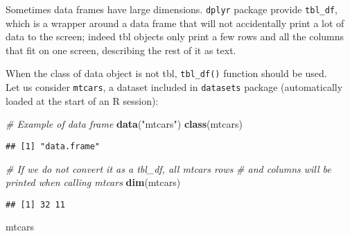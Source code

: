 \documentclass[]{book}
\newenvironment{Shaded}{\begin{snugshade}}{\end{snugshade}}
\newcommand{\KeywordTok}[1]{\textcolor[rgb]{0.13,0.29,0.53}{\textbf{{#1}}}}
\newcommand{\StringTok}[1]{\textcolor[rgb]{0.31,0.60,0.02}{{#1}}}
\newcommand{\CommentTok}[1]{\textcolor[rgb]{0.56,0.35,0.01}{\textit{{#1}}}}
\newcommand{\NormalTok}[1]{{#1}}
\begin{document}
Sometimes data frames have large dimensions. \texttt{dplyr} package
provide \texttt{tbl\_df}, which is a wrapper around a data frame that
will not accidentally print a lot of data to the screen; indeed tbl
objects only print a few rows and all the columns that fit on one
screen, describing the rest of it as text.

When the class of data object is not tbl, \texttt{tbl\_df()} function
should be used.\\
Let us consider \texttt{mtcars}, a dataset included in \texttt{datasets}
package (automatically loaded at the start of an R session):

\begin{Shaded}
\begin{Highlighting}[]
\CommentTok{# Example of data frame}
\KeywordTok{data}\NormalTok{(}\StringTok{"mtcars"}\NormalTok{)}
\KeywordTok{class}\NormalTok{(mtcars)}
\end{Highlighting}
\end{Shaded}

\begin{verbatim}
## [1] "data.frame"
\end{verbatim}

\begin{Shaded}
\begin{Highlighting}[]
\CommentTok{# If we do not convert it as a tbl_df, all mtcars rows }
\CommentTok{# and columns will be printed when calling mtcars }
\KeywordTok{dim}\NormalTok{(mtcars)}
\end{Highlighting}
\end{Shaded}

\begin{verbatim}
## [1] 32 11
\end{verbatim}

\begin{Shaded}
\begin{Highlighting}[]
\NormalTok{mtcars}
\end{Highlighting}
\end{Shaded}
\end{document}
